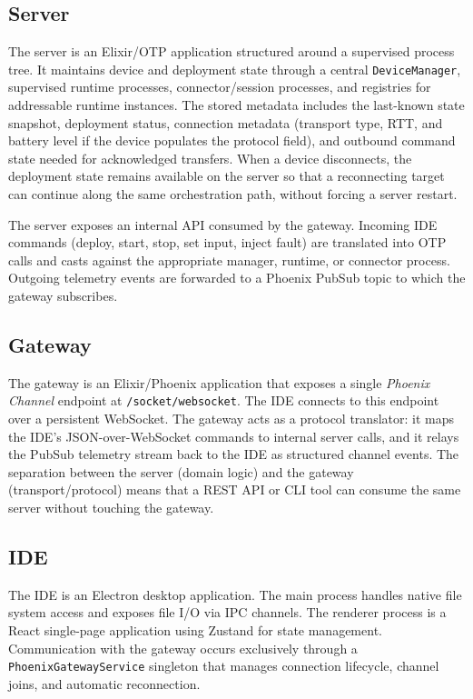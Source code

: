 \subsection{Server}

The server is an Elixir/OTP application structured around a supervised process tree. It maintains device and deployment state through a central \texttt{DeviceManager}, supervised runtime processes, connector/session processes, and registries for addressable runtime instances. The stored metadata includes the last-known state snapshot, deployment status, connection metadata (transport type, RTT, and battery level if the device populates the protocol field), and outbound command state needed for acknowledged transfers. When a device disconnects, the deployment state remains available on the server so that a reconnecting target can continue along the same orchestration path, without forcing a server restart.

The server exposes an internal API consumed by the gateway. Incoming IDE commands (deploy, start, stop, set input, inject fault) are translated into OTP calls and casts against the appropriate manager, runtime, or connector process. Outgoing telemetry events are forwarded to a Phoenix PubSub topic to which the gateway subscribes.

\subsection{Gateway}

The gateway is an Elixir/Phoenix application that exposes a single \textit{Phoenix Channel} endpoint at \texttt{/socket/websocket}. The IDE connects to this endpoint over a persistent WebSocket. The gateway acts as a protocol translator: it maps the IDE's JSON-over-WebSocket commands to internal server calls, and it relays the PubSub telemetry stream back to the IDE as structured channel events. The separation between the server (domain logic) and the gateway (transport/protocol) means that a REST API or CLI tool can consume the same server without touching the gateway.

\subsection{IDE}

The IDE is an Electron desktop application. The main process handles native file system access and exposes file I/O via IPC channels. The renderer process is a React single-page application using Zustand for state management. Communication with the gateway occurs exclusively through a \texttt{PhoenixGatewayService} singleton that manages connection lifecycle, channel joins, and automatic reconnection.

